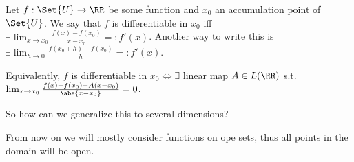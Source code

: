 \begin{defn}
 Let $f:\Set{U}\to\RR$ be some function and $x_0$ an accumulation point of $\Set{U}$. We say that $f$ is differentiable in $x_0$ iff $\exists \lim_{x\to x_0} \frac{f(x)-f(x_0)}{x-x_0}=:f'(x)$. Another way to write this is $\exists \lim_{h\to 0}\frac{f(x_0+h)-f(x_0)}{h}=:f'(x)$. 
\end{defn}
\begin{rem}
 Equivalently, $f$ is differentiable in $x_0\Leftrightarrow \exists$ linear map $A\in L(\RR)$ s.t. $\lim_{x\to x_0}\frac{f(x)-f(x_0)-A(x-x_0)}{\abs{x-x_0}}=0$.
\end{rem}
So how can we generalize this to several dimensions?
\begin{rem}
 From now on we will mostly consider functions on ope sets, thus all points in the domain will be open. 
\end{rem}

